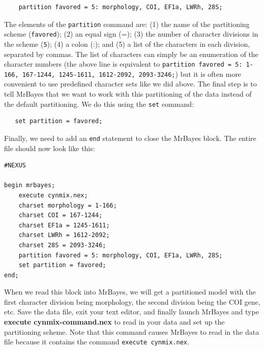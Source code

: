 \documentclass[12pt]{book}
\begin{document}
\begin{singlespacing}
\begin{verbatim}
    partition favored = 5: morphology, COI, EF1a, LWRh, 28S;
\end{verbatim}
\end{singlespacing}

The elements of the \texttt{partition} command are: (1) the name of the partitioning scheme 
(\texttt{favored}); (2) an equal sign (=); (3) the number of character divisions in the scheme (\texttt{5}); 
(4) a colon (:); and (5) a list of the characters in each division, separated by commas. The list of 
characters can simply be an enumeration of the character numbers (the above line is equivalent to 
\texttt{partition favored = 5: 1-166, 167-1244, 1245-1611, 1612-2092, 2093-3246;}) but it is often more 
convenient to use predefined character sets like we did above. The final step is to tell MrBayes that we 
want to work with this partitioning of the data instead of the default partitioning. We do this using the 
\texttt{set} command:

\begin{singlespacing}
\small
\begin{verbatim}
   set partition = favored;
\end{verbatim}
\normalsize
\end{singlespacing}

Finally, we need to add an \texttt{end} statement to close the MrBayes block. The entire file should now 
look like this:

\begin{singlespacing}
\small
\begin{verbatim}
#NEXUS
  
begin mrbayes;
    execute cynmix.nex;
    charset morphology = 1-166;
    charset COI = 167-1244;
    charset EF1a = 1245-1611;
    charset LWRh = 1612-2092;
    charset 28S = 2093-3246;
    partition favored = 5: morphology, COI, EF1a, LWRh, 28S;
    set partition = favored;
end;
\end{verbatim}
\normalsize
\end{singlespacing}

When we read this block into MrBayes, we will get a partitioned model with the first character division 
being morphology, the second division being the COI gene, etc. Save the data file, exit your text editor, 
and finally launch MrBayes and type \textbf{execute cynmix-command.nex} to read in your data and set up the 
partitioning scheme. Note that this command causes MrBayes to read in the data file because it contains the 
command \texttt{execute cynmix.nex}.
\end{document}
